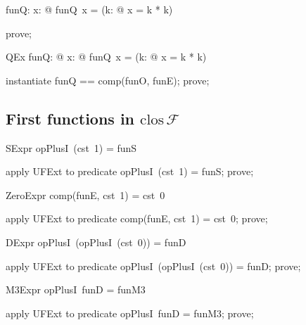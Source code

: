 \documentclass{article}
\begin{document}
\begin{axdef}
  funQ: \nat \fun \nat
\where
   \forall x: \nat @ funQ~x = \IF (\exists k: \nat @ x = k * k)  
\end{axdef}

\begin{zproof}
prove;
\end{zproof}

\begin{theorem}{QEx}
  \exists funQ: \nat \fun \nat @
    \forall x: \nat @ funQ~x = \IF (\exists k: \nat @ x = k * k)  
\end{theorem}

\begin{zproof}
instantiate funQ == comp(funO, funE);
prove;
\end{zproof}

\subsection{First functions in $\mathrm{clos}\,\mathcal{F}$}

\begin{theorem}{SExpr}
  opPlusI~(cst~1) = funS
\end{theorem}

\begin{zproof}
apply UFExt to predicate opPlusI~(cst~1) = funS;
prove;
\end{zproof}

\begin{theorem}{ZeroExpr}
  comp(funE, cst~1) = cst~0
\end{theorem}

\begin{zproof}
apply UFExt to predicate comp(funE, cst~1) = cst~0;
prove;
\end{zproof}

\begin{theorem}{DExpr}
  opPlusI~(opPlusI~(cst~0)) = funD
\end{theorem}

\begin{zproof}
apply UFExt to predicate opPlusI~(opPlusI~(cst~0)) = funD;
prove;
\end{zproof}

\begin{theorem}{M3Expr}
  opPlusI~funD = funM3
\end{theorem}

\begin{zproof}
apply UFExt to predicate opPlusI~funD = funM3;
prove;
\end{zproof}
\end{document}
